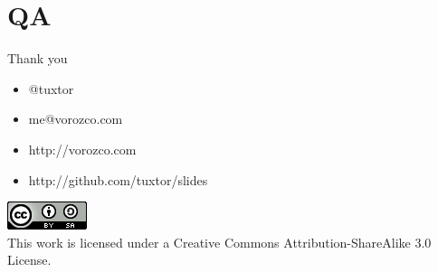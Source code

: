 \documentclass[14pt]{beamer}
\begin{document}
\section{QA}
\begin{frame}{Thank you}
\begin{itemize}
\item @tuxtor
\item me@vorozco.com
\item http://vorozco.com
\item http://github.com/tuxtor/slides
\end{itemize}
\begin{center}
\includegraphics[width=0.1\linewidth]{Images/cclogo}
\\
This work is licensed under a Creative Commons Attribution-ShareAlike 3.0 License.
\end{center}
\end{frame}
\end{document}

